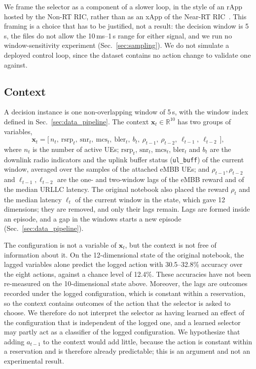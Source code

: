 We frame the selector as a component of a slower loop, in the style of an rApp hosted by the Non-RT RIC, rather than as an xApp of the Near-RT RIC~\cite{TODO-oran-timescales}.%
This framing is a choice that has to be justified, not a result: the decision window is 5\,s, the files do not allow the 10\,ms--1\,s range for either signal, and we run no window-sensitivity experiment (Sec.~\ref{sec:sampling}).%
We do not simulate a deployed control loop, since the dataset contains no action change to validate one against.%

\subsection{Context}
\label{sec:state}

A decision instance is one non-overlapping window of 5\,s, with the window index defined in Sec.~\ref{sec:data_pipeline}.%
The context $\mathbf{x}_t\in\mathbb{R}^{10}$ has two groups of variables,
\begin{equation}
  \mathbf{x}_t=\bigl[\,n_t,\ \mathrm{rsrp}_t,\ \mathrm{snr}_t,\ \mathrm{mcs}_t,\ \mathrm{bler}_t,\ b_t,\ \rho_{t-1},\ \rho_{t-2},\ \ell_{t-1},\ \ell_{t-2}\,\bigr],
  \label{eq:state}
\end{equation}%
where $n_t$ is the number of active UEs; $\mathrm{rsrp}_t$, $\mathrm{snr}_t$, $\mathrm{mcs}_t$, $\mathrm{bler}_t$ and $b_t$ are the downlink radio indicators and the uplink buffer status (\texttt{ul\_buff}) of the current window, averaged over the samples of the attached eMBB UEs; and $\rho_{t-1},\rho_{t-2}$ and $\ell_{t-1},\ell_{t-2}$ are the one- and two-window lags of the eMBB reward and of the median URLLC latency.%
The original notebook also placed the reward $\rho_t$ and the median latency $\ell_t$ of the current window in the state, which gave 12 dimensions; they are removed, and only their lags remain.%
Lags are formed inside an episode, and a gap in the windows starts a new episode (Sec.~\ref{sec:data_pipeline}).%

The configuration is not a variable of $\mathbf{x}_t$, but the context is not free of information about it.%
On the 12-dimensional state of the original notebook, the lagged variables alone predict the logged action with 30.5--32.8\% accuracy over the eight actions, against a chance level of 12.4\%.%
These accuracies have not been re-measured on the 10-dimensional state above.%
Moreover, the lags are outcomes recorded under the logged configuration, which is constant within a reservation, so the context contains outcomes of the action that the selector is asked to choose.%
We therefore do not interpret the selector as having learned an effect of the configuration that is independent of the logged one, and a learned selector may partly act as a classifier of the logged configuration.%
We hypothesize that adding $a_{t-1}$ to the context would add little, because the action is constant within a reservation and is therefore already predictable; this is an argument and not an experimental result.%

